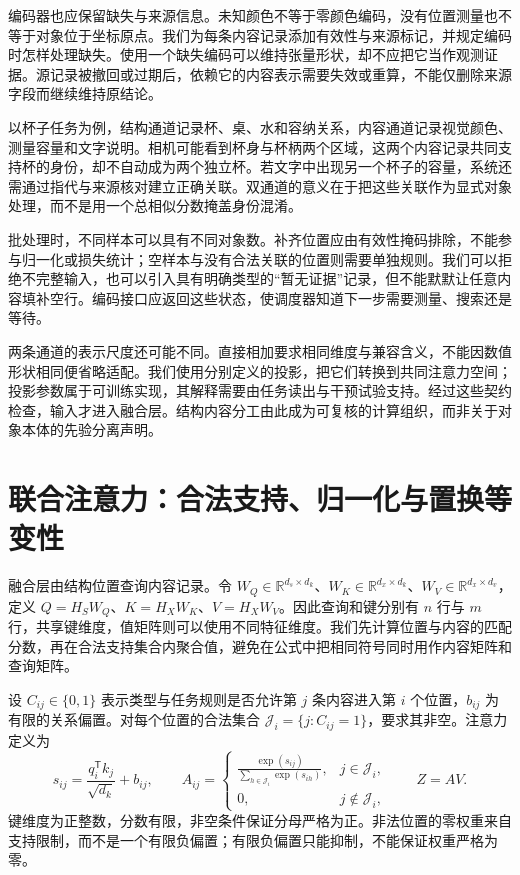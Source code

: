 编码器也应保留缺失与来源信息。未知颜色不等于零颜色编码，没有位置测量也不等于对象位于坐标原点。我们为每条内容记录添加有效性与来源标记，并规定编码时怎样处理缺失。使用一个缺失编码可以维持张量形状，却不应把它当作观测证据。源记录被撤回或过期后，依赖它的内容表示需要失效或重算，不能仅删除来源字段而继续维持原结论。

以杯子任务为例，结构通道记录杯、桌、水和容纳关系，内容通道记录视觉颜色、测量容量和文字说明。相机可能看到杯身与杯柄两个区域，这两个内容记录共同支持杯的身份，却不自动成为两个独立杯。若文字中出现另一个杯子的容量，系统还需通过指代与来源核对建立正确关联。双通道的意义在于把这些关联作为显式对象处理，而不是用一个总相似分数掩盖身份混淆。

批处理时，不同样本可以具有不同对象数。补齐位置应由有效性掩码排除，不能参与归一化或损失统计；空样本与没有合法关联的位置则需要单独规则。我们可以拒绝不完整输入，也可以引入具有明确类型的“暂无证据”记录，但不能默默让任意内容填补空行。编码接口应返回这些状态，使调度器知道下一步需要测量、搜索还是等待。

两条通道的表示尺度还可能不同。直接相加要求相同维度与兼容含义，不能因数值形状相同便省略适配。我们使用分别定义的投影，把它们转换到共同注意力空间；投影参数属于可训练实现，其解释需要由任务读出与干预试验支持。经过这些契约检查，输入才进入融合层。结构内容分工由此成为可复核的计算组织，而非关于对象本体的先验分离声明。

\section{联合注意力：合法支持、归一化与置换等变性}
\label{sec:fusion_attention}

融合层由结构位置查询内容记录。令 $W_Q\in\mathbb R^{d_s\times d_k}$、$W_K\in\mathbb R^{d_x\times d_k}$、$W_V\in\mathbb R^{d_x\times d_v}$，定义 $Q=H_SW_Q$、$K=H_XW_K$、$V=H_XW_V$。因此查询和键分别有 $n$ 行与 $m$ 行，共享键维度，值矩阵则可以使用不同特征维度。我们先计算位置与内容的匹配分数，再在合法支持集合内聚合值，避免在公式中把相同符号同时用作内容矩阵和查询矩阵。

设 $C_{ij}\in\{0,1\}$ 表示类型与任务规则是否允许第 $j$ 条内容进入第 $i$ 个位置，$b_{ij}$ 为有限的关系偏置。对每个位置的合法集合 $\mathcal J_i=\{j:C_{ij}=1\}$，要求其非空。注意力定义为
\begin{equation}
s_{ij}=\frac{q_i^{\mathsf T}k_j}{\sqrt{d_k}}+b_{ij},\qquad
A_{ij}=\begin{cases}
\displaystyle\frac{\exp(s_{ij})}{\sum_{h\in\mathcal J_i}\exp(s_{ih})},&j\in\mathcal J_i,\\
0,&j\notin\mathcal J_i,
\end{cases}\qquad Z=AV.
\end{equation}
键维度为正整数，分数有限，非空条件保证分母严格为正。非法位置的零权重来自支持限制，而不是一个有限负偏置；有限负偏置只能抑制，不能保证权重严格为零。

